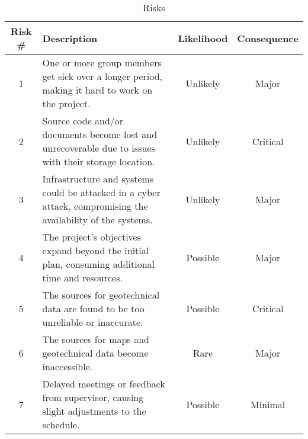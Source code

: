 \begin{table}[H]
    \centering
    \begin{tabularx}{\textwidth}{|c|>{\centering\arraybackslash}X|c|c|}
    \hline
    \textbf{Risk \#} & \textbf{Description} & \textbf{Likelihood} & \textbf{Consequence} \\
    \hline
    1 & One or more group members get sick over a longer period, making it hard to work on the project. & Unlikely \cellcolor[HTML]{ffC300} & Major \cellcolor[HTML]{ffC300} \\
    \hline
    2 & Source code and/or documents become lost and unrecoverable due to issues with their storage location. & Unlikely \cellcolor[HTML]{ffC300} & Critical \cellcolor[HTML]{ffC300} \\
    \hline
    3 & Infrastructure and systems could be attacked in a cyber attack, compromising the availability of the systems. & Unlikely \cellcolor[HTML]{ffC300} & Major \cellcolor[HTML]{ffC300} \\
    \hline
    4 & The project's objectives expand beyond the initial plan, consuming additional time and resources. & Possible \cellcolor[HTML]{ffC300} & Major \cellcolor[HTML]{ffC300} \\
    \hline
    5 & The sources for geotechnical data are found to be too unreliable or inaccurate. & Possible \cellcolor[HTML]{ff4233} & Critical \cellcolor[HTML]{ff4233} \\
    \hline
    6 & The sources for maps and geotechnical data become inaccessible. & Rare \cellcolor[HTML]{fff000} & Major \cellcolor[HTML]{fff000} \\
    \hline
    7 & Delayed meetings or feedback from supervisor, causing slight adjustments to the schedule. & Possible \cellcolor[HTML]{74ff00} & Minimal \cellcolor[HTML]{74ff00} \\
    \hline
    \end{tabularx}
    \caption{Risks}
    \label{tab:risks}
\end{table}

